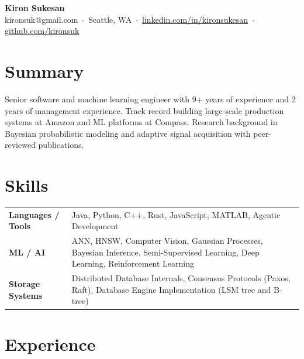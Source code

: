 \documentclass[10pt, letterpaper]{article}
\newcommand{\resumeheader}[5]{%
  \begin{center}
    {\LARGE\bfseries #1}\\[4pt]
    {\color{lightgray}\small
      #2 \,$\cdot$\, #3 \,$\cdot$\, \href{#4}{linkedin.com/in/kironsukesan} \,$\cdot$\, \href{#5}{github.com/kironsuk}
    }
  \end{center}
}
\begin{document}
\pagestyle{empty}

\resumeheader
  {Kiron Sukesan}
  {kironsuk@gmail.com}
  {Seattle, WA}
  {https://linkedin.com/in/kironsukesan}
  {https://github.com/kironsuk}

\vspace{5pt}

\section{Summary}
Senior software and machine learning engineer with 9+ years of experience and 2 years of management experience. Track record building large-scale production systems at Amazon and ML platforms at Compass. Research background in Bayesian probabilistic modeling and adaptive signal acquisition with peer-reviewed publications.

\section{Skills}
\begin{tabularx}{\linewidth}{@{} l X @{}}
  \textbf{Languages / Tools}      & Java, Python, C++, Rust, JavaScript, MATLAB, Agentic Development \\[2pt]
  \textbf{ML / AI}        & ANN, HNSW, Computer Vision, Gaussian Processes, Bayesian Inference, Semi-Supervised Learning, Deep Learning, Reinforcement Learning \\[2pt]
  \textbf{Storage Systems}        & Distributed Database Internals, Consensus Protocols (Paxos, Raft), Database Engine Implementation (LSM tree and B-tree)  \\[2pt]
\end{tabularx}

\section{Experience}
\end{document}
